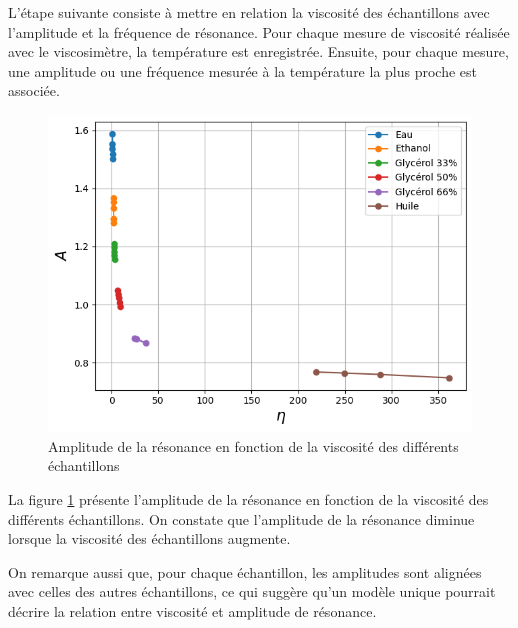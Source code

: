 L’étape suivante consiste à mettre en relation la viscosité des échantillons avec l’amplitude et la fréquence de résonance.  
Pour chaque mesure de viscosité réalisée avec le viscosimètre, la température est enregistrée. Ensuite, pour chaque mesure, une amplitude ou une fréquence mesurée à la température la plus proche est associée.
\newpage
\begin{figure}[H]
    \centering
    \includegraphics[width=\textwidth]{assets/figures/Amplitude-viscosite.png}
    \caption{Amplitude de la résonance en fonction de la viscosité des différents échantillons}
    \label{fig:Amplitude VS Viscosité}
\end{figure}

La figure \ref{fig:Amplitude VS Viscosité} présente l'amplitude de la résonance en fonction de la viscosité des différents échantillons.  
On constate que l'amplitude de la résonance diminue lorsque la viscosité des échantillons augmente.

On remarque aussi que, pour chaque échantillon, les amplitudes sont alignées avec celles des autres échantillons, ce qui suggère qu’un modèle unique pourrait décrire la relation entre viscosité et amplitude de résonance.

